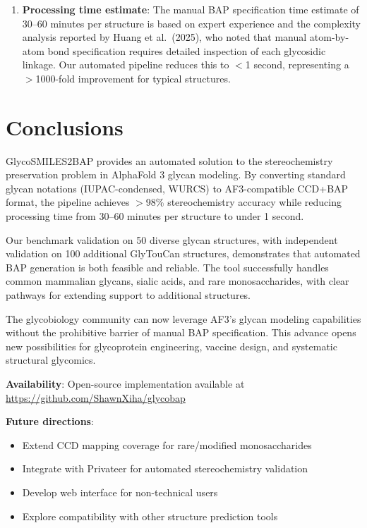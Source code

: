 \documentclass[11pt,a4paper]{article}
\begin{document}
\begin{enumerate}
\item \textbf{Processing time estimate}: The manual BAP specification time estimate of 30--60 minutes per structure is based on expert experience and the complexity analysis reported by Huang et al.\ (2025), who noted that manual atom-by-atom bond specification requires detailed inspection of each glycosidic linkage. Our automated pipeline reduces this to $<$1 second, representing a $>$1000-fold improvement for typical structures.
\end{enumerate}


\section{Conclusions}

GlycoSMILES2BAP provides an automated solution to the stereochemistry preservation problem in AlphaFold 3 glycan modeling. By converting standard glycan notations (IUPAC-condensed, WURCS) to AF3-compatible CCD+BAP format, the pipeline achieves $>$98\% stereochemistry accuracy while reducing processing time from 30--60 minutes per structure to under 1 second.

Our benchmark validation on 50 diverse glycan structures, with independent validation on 100 additional GlyTouCan structures, demonstrates that automated BAP generation is both feasible and reliable. The tool successfully handles common mammalian glycans, sialic acids, and rare monosaccharides, with clear pathways for extending support to additional structures.

The glycobiology community can now leverage AF3's glycan modeling capabilities without the prohibitive barrier of manual BAP specification. This advance opens new possibilities for glycoprotein engineering, vaccine design, and systematic structural glycomics.

\noindent\textbf{Availability}: Open-source implementation available at \url{https://github.com/ShawnXiha/glycobap}

\noindent\textbf{Future directions}:
\begin{itemize}
\item Extend CCD mapping coverage for rare/modified monosaccharides
\item Integrate with Privateer for automated stereochemistry validation
\item Develop web interface for non-technical users
\item Explore compatibility with other structure prediction tools
\end{itemize}
\end{document}
